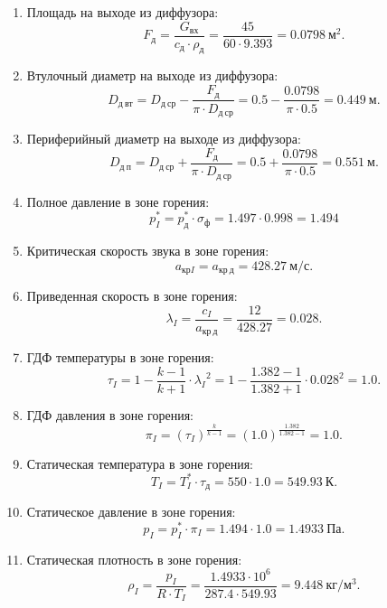 \documentclass[a4paper,10pt]{article}
\begin{document}
\begin{enumerate}
    	\item Площадь на выходе из диффузора:
    	\[
    		F_д = \frac{G_{вх}}{ c_д \cdot \rho_д } = \frac{45
    				}{ 
    				60 \cdot 9.393 
    			} =
    		0.0798\ м^2. 
    	\]

    	\item Втулочный диаметр на выходе из диффузора:
    	\[
    		D_{д\ вт} = D_{д\ ср} - \frac{F_д}{\pi \cdot D_{д\ ср}} = 
    		0.5 - \frac{0.0798}{\pi \cdot 0.5} = 
    		0.449\ м.
    	\]

    	\item Периферийный диаметр на выходе из диффузора:
    	\[
    		D_{д\ п} = D_{д\ ср} + \frac{F_д}{\pi \cdot D_{д\ ср}} = 
    		0.5 + \frac{0.0798}{\pi \cdot 0.5} = 
    		0.551\ м.
    	\]

    	\item Полное давление в зоне горения:
    	\[
    		p_I^* = p_д^* \cdot \sigma_ф = 1.497 \cdot 0.998 = 
    		1.494
    	\]

    	\item Критическая скорость звука в зоне горения:
    	\[
    		a_{крI} = a_{кр\ д} =
    		428.27\ м/с.
    	\]

    	\item Приведенная скорость в зоне горения:
    	\[
    		\lambda_I = \frac{c_I}{a_{кр\ д}} = \frac{12}{428.27} = 
    		0.028.
    	\]

    	\item ГДФ температуры в зоне горения:
    	\[
    		\tau_I =  1 - \frac{k - 1}{k + 1} \cdot {\lambda_I}^2  =  
    		1 - \frac{1.382 - 1}{1.382 + 1} 
    		\cdot {0.028}^2  = 
    		1.0.
    	\]

    	\item ГДФ давления в зоне горения:
    	\[
    		\pi_I = \left( \tau_I  \right) ^ \frac{k}{k -1} = 
    		\left( 
    			1.0  
    			\right) ^ \frac{1.382}{1.382 -1} = 
    		1.0.
    	\]

    	\item Статическая температура в зоне горения:
    	\[
    		T_{I} = T_{I}^* \cdot \tau_д = 550 \cdot 1.0 = 549.93\ К.
    	\]

    	\item Статическое давление в зоне горения:
    	\[
    		p_{I} = p_I^* \cdot \pi_I = 1.494 \cdot 1.0 = 
    		1.4933\ Па.
    	\]

    	\item Статическая плотность в зоне горения:
    	\[
    		\rho_I = \frac{p_I}{R \cdot T_I} = 
    		\frac{1.4933 \cdot 10^6}{ 287.4 \cdot 549.93} =
    		9.448\ кг/м^3.
    	\]


\end{enumerate}
\end{document}
